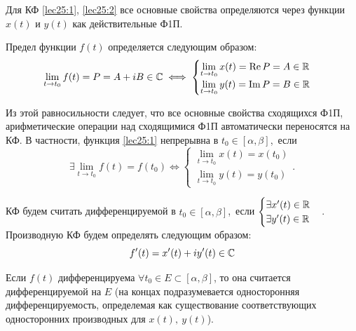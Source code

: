 \documentclass[../../main.tex]{subfiles}
\begin{document}
\hfill

Для КФ \eqref{lec25:1}, \eqref{lec25:2}  все основные свойства определяются
через функции $x(t)$ и $y(t)$ как действительные Ф1П.

Предел функции $f(t)$ определяется следующим образом: 
\[
\lim\limits_{t \to t_0}  f(t) = P = A + iB \in \mathbb{C} \iff
\begin{cases}
	\lim\limits_{t \to t_0}  x(t)  = \operatorname{Re} P = A \in \mathbb{R} \\
	\lim\limits_{t \to t_0}  y(t)  = \operatorname{Im} P = B \in \mathbb{R}
\end{cases} 
\]

Из этой равносильности следует, 
что  все основные свойства сходящихся Ф1П,
арифметические операции над сходящимися Ф1П автоматически переносятся на КФ.
В частности, функция \eqref{lec25:1} непрерывна в $t_0 \in [\alpha,\beta ]$,\
если
\[\exists \lim\limits_{t \to t_0}  f(t) = f(t_0) \iff 
\begin{cases}
	\lim\limits_{t \to t_0}  x(t)  = x(t_0) \\
	\lim\limits_{t \to t_0}  y(t)  =  y(t_0)
\end{cases}.\]

КФ будем считать дифференцируемой в $t_0 \in [\alpha,\beta ]$,\   если 
$\begin{cases}
	\exists x'(t)  \in \mathbb{R} \\
	\exists y'(t)  \in \mathbb{R}
\end{cases}$. Производную КФ будем определять следующим образом:
\[
	f'(t) = x'(t) + iy'(t) \in \mathbb{C}
\]

Если $f(t)$ дифференцируема $\forall t_0 \in E \subset [\alpha,\beta ]$, 
то она считается дифференцируемой на $E$ (на концах 
подразумевается односторонняя дифференцируемость,
определемая как существование соответствующих 
односторонних производных для $x(t), \ y(t)$).
\end{document}
